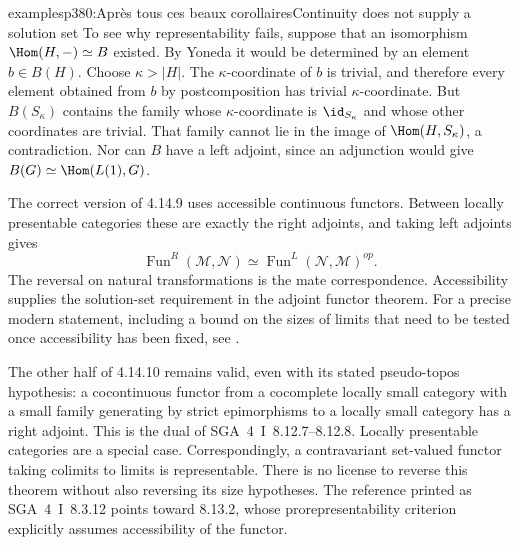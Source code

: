 \begin{dcomment}{examples}{p380:Après tous ces beaux corollaires}{Continuity does not supply a solution set}
To see why representability fails, suppose that an isomorphism $\Hom(H,-)\simeq B$ existed. By Yoneda it would be determined by an element $b\in B(H)$. Choose $\kappa>|H|$. The $\kappa$-coordinate of $b$ is trivial, and therefore every element obtained from $b$ by postcomposition has trivial $\kappa$-coordinate. But $B(S_\kappa)$ contains the family whose $\kappa$-coordinate is $\id_{S_\kappa}$ and whose other coordinates are trivial. That family cannot lie in the image of $\Hom(H,S_\kappa)$, a contradiction. Nor can $B$ have a left adjoint, since an adjunction would give $B(G)\simeq\Hom(L(1),G)$.

The correct version of 4.14.9 uses accessible continuous functors. Between locally presentable categories these are exactly the right adjoints, and taking left adjoints gives
\[
 \operatorname{Fun}^{R}(\mathcal M,\mathcal N)
 \simeq
 \operatorname{Fun}^{L}(\mathcal N,\mathcal M)^{op}.
\]
The reversal on natural transformations is the mate correspondence. Accessibility supplies the solution-set requirement in the adjoint functor theorem. For a precise modern statement, including a bound on the sizes of limits that need to be tested once accessibility has been fixed, see \citet[Theorems~2.9 and~2.11]{Tendas2022Continuity}.

The other half of 4.14.10 remains valid, even with its stated pseudo-topos hypothesis: a cocontinuous functor from a cocomplete locally small category with a small family generating by strict epimorphisms to a locally small category has a right adjoint. This is the dual of SGA~4~I~8.12.7--8.12.8. Locally presentable categories are a special case. Correspondingly, a contravariant set-valued functor taking colimits to limits is representable. There is no license to reverse this theorem without also reversing its size hypotheses. The reference printed as SGA~4~I~8.3.12 points toward 8.13.2, whose prorepresentability criterion explicitly assumes accessibility of the functor.
\end{dcomment}

